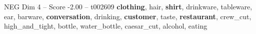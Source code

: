\begin{textsample}{NEG Dim 4 – Score -2.00 – t002609}  \label{ex:f4_neg_020}
\textbf{clothing}, hair, \textbf{shirt}, drinkware, tableware, ear, barware, \textbf{conversation}, drinking, \textbf{customer}, taste, \textbf{restaurant}, crew\_cut, high\_and\_tight, bottle, water\_bottle, caesar\_cut, alcohol, eating

\end{textsample}
